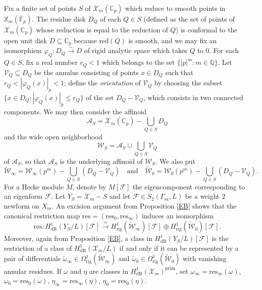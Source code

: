 \documentclass[a4paper,11pt]{amsart}
\numberwithin{equation}{section}
\theoremstyle{plain}
\theoremstyle{definition}
\theoremstyle{remark}
\newcommand{\Q}{\mathbb Q}
\newcommand{\C}{\mathbb C}
\newcommand{\F}{\mathbb F}
\newcommand{\res}{\mathrm{res}}
\newcommand{\rig}{\mathrm{rig}}
\newcommand{\dR}{\mathrm{dR}}
\begin{document}
Fix a finite set of points $S$ of $\mathscr{X}_m(\C_p)$ which reduce to smooth points in $\mathbb{X}_m(\overline{\F}_p)$. The residue disk $D_Q$ of each $Q\in S$ (defined as the set of points of $\mathscr{X}_m(\C_p)$ whose reduction is equal to the reduction of $Q$) is conformal to the open unit disk $D\subseteq\C_p$ because $\mathrm{red}(Q)$ is smooth, and we may fix an isomorphism $\varphi_Q\colon D_Q\overset\sim\rightarrow D$ of rigid analytic space which takes $Q$ to $0$. For each $Q\in S$, fix a real number $r_Q<1$ which belongs to the set $\{|p|^m:m\in\Q\}$. 
Let $\mathcal{V}_{Q}\subseteq D_Q$ be the annulus consisting of points $x\in D_Q$ such that $r_Q<|\varphi_Q(x)|_p<1$; define the \emph{orientation} of $\mathcal{V}_Q$ by choosing the subset $\{x\in D_Q: |\varphi_Q(x)|_p\leq r_Q\}$ of the set $D_Q-\mathcal{V}_Q$, which consists in two connected components. We may then consider the
affinoid 
\[\mathcal{A}_S=\mathscr{X}_m(\C_p)-\bigcup_{Q\in S}D_Q\] and the 
 wide open neighborhood
\[\mathcal{W}_S=\mathcal{A}_S\cup \bigcup_{Q\in S}\mathcal{V}_Q\]
of $\mathcal{A}_S$, so that $\mathcal{A}_S$ is the underlying affinoid of $\mathcal{W}_S$. We also put 
\[\widetilde{\mathcal{W}}_\infty= \mathcal{W}_\infty(p^m)-\bigcup_{Q\in S}(D_Q-\mathcal{V}_Q)\quad\text{and}\quad\widetilde{\mathcal{W}}_0= \mathcal{W}_0(p^m)-\bigcup_{Q\in S}(D_Q-\mathcal{V}_Q).\]
For a Hecke module $M$, denote by $M[\mathcal{F}]$ the eigencomponent corresponding to an eigenform $\mathcal{F}$. 
Let $Y_S=\mathscr{X}_m-S$ and let $\mathcal{F}\in S_2(\Gamma_m,L)$ be a weight $2$ newform on ${X}_m$. 
An excision argument from Proposition \ref{EB}
shows that the canonical restriction map $\res=(\res_0,\res_\infty)$ induces an isomorphism 
\begin{equation}\label{eq:9.3} 
\res\colon H^1_\dR(Y_S/L)[\mathcal{F}]\overset\simeq\longrightarrow H^1_\rig(\widetilde{\mathcal{W}}_\infty)[\mathcal{F}]\oplus H^1_\rig(\widetilde{\mathcal{W}}_0)[\mathcal{F}].\end{equation} Moreover, again from  Proposition \ref{EB}, a class in $H^1_\dR(Y_S/L)[\mathcal{F}]$ is the restriction of a class of $H^1_\dR(\mathscr{X}_m/L)$ if and only if it can be represented by a pair of differentials $\tilde\omega_\infty\in \Omega^1_{\rig}(\widetilde{\mathcal{W}}_\infty)$ and $\tilde\omega_0\in \Omega^1_{\rig}(\widetilde{\mathcal{W}}_0)$
with vanishing annular residues. 
If $\omega$ and $\eta$ are classes in 
$H^1_\mathrm{dR}(\mathscr{X}_m)^\mathrm{prim}$, set $\omega_\infty=\mathrm{res}_\infty(\omega)$, $\omega_0=\mathrm{res}_0(\omega)$, $\eta_\infty=\mathrm{res}_\infty(\eta)$, $\eta_0=\mathrm{res}_0(\eta)$. 
\end{document}
